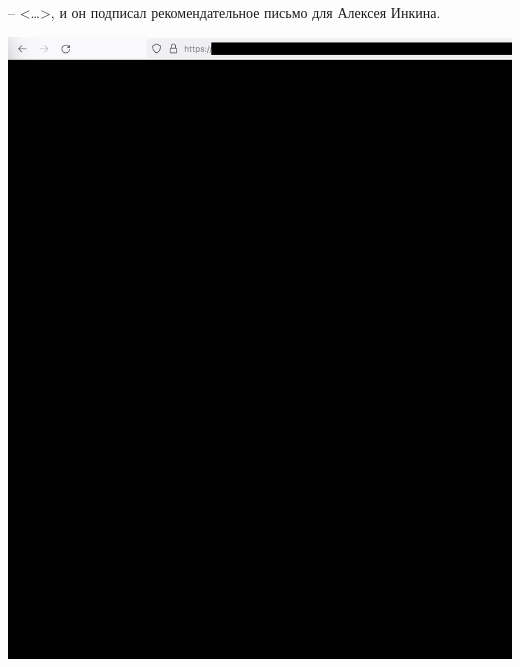 
\MrPhpOne -- <\dots>, и он подписал рекомендательное письмо для Алексея Инкина.

\begin{center}
    \includegraphics[width=36em]{php-one-company-role-p1_public}
\end{center}
\WillContinue
\pagebreak

